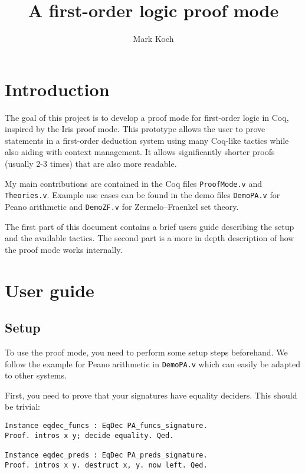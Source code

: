 \documentclass[12pt, a4paper]{article}
\title{A first-order logic proof mode}
\author{Mark Koch}
\begin{document}
\maketitle
\tableofcontents


\section{Introduction}

The goal of this project is to develop a proof mode for first-order logic in Coq, inspired by the Iris proof mode.
This prototype allows the user to prove statements in a first-order deduction system using many Coq-like tactics while also aiding with context management.
It allows significantly shorter proofs (usually 2-3 times) that are also more readable.

My main contributions are contained in the Coq files \texttt{ProofMode.v} and \texttt{Theories.v}. Example use cases can be found in the demo files \texttt{DemoPA.v} for Peano arithmetic and \texttt{DemoZF.v} for Zermelo–Fraenkel set theory.

\medskip\noindent
The first part of this document contains a brief users guide describing the setup and the available tactics.
The second part is a more in depth description of how the proof mode works internally.


\section{User guide}

\subsection{Setup}

To use the proof mode, you need to perform some setup steps beforehand.
We follow the example for Peano arithmetic in \texttt{DemoPA.v} which can easily be adapted to other systems.

\medskip\noindent
First, you need to prove that your signatures have equality deciders. This should be trivial:

\begin{center}
\begin{minipage}{.75\textwidth}
\begin{verbatim}
Instance eqdec_funcs : EqDec PA_funcs_signature.
Proof. intros x y; decide equality. Qed.

Instance eqdec_preds : EqDec PA_preds_signature.
Proof. intros x y. destruct x, y. now left. Qed.
\end{verbatim}
\end{minipage}
\end{center}
\end{document}
